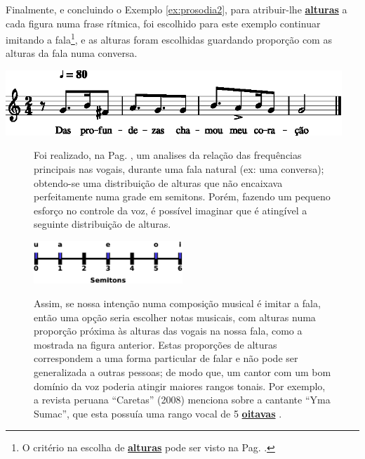 \begin{example}
\label{ex:prosodia3}
Finalmente, e concluindo o Exemplo \ref{ex:prosodia2}, 
para atribuir-lhe \hyperref[sec:pos:Altura]{\textbf{alturas}} a cada figura numa frase rítmica,
foi escolhido para este exemplo continuar imitando a fala\footnote{O 
critério na escolha de \hyperref[sec:pos:Altura]{\textbf{alturas}} pode ser visto na Pag. \pageref{ref:minhasvogais}. },
e as alturas foram escolhidas guardando proporção com as alturas da fala numa conversa.
\begin{center}
\includegraphics[width=0.95\textwidth]{chapters/cap-musica-topicos/frase5-1.eps}
\end{center}
\end{example}

\begin{figure}[!ht]
\begin{elaboracion}[title=Minhas vogais]
Foi realizado, na Pag. \pageref{fig:timbresvocais}, um analises da relação das frequências principais nas vogais,
durante uma fala natural (ex: uma conversa);
obtendo-se uma distribuição de alturas que não encaixava perfeitamente numa grade em semitons.
Porém, fazendo um pequeno esforço no controle da voz, 
é possível imaginar que é atingível a seguinte distribuição de alturas.
\begin{center}
\includegraphics[width=0.50\textwidth]{chapters/cap-musica-topicos/vocales-semitons2.eps}
\end{center}
Assim, se nossa intenção numa composição musical é imitar a fala, 
então uma opção seria escolher notas musicais, 
com alturas numa proporção próxima às alturas das vogais na nossa fala, 
como a mostrada na figura anterior.
Estas proporções de alturas correspondem a uma forma particular de falar e não pode ser generalizada a outras pessoas;
de modo que, um cantor com um bom domínio da voz poderia atingir maiores rangos tonais.
Por exemplo, a revista peruana ``Caretas'' (2008)  menciona sobre a cantante ``Yma Sumac'',
que esta possuía uma rango vocal de 5 \hyperref[sec:pos:Oitava]{\textbf{oitavas}} \cite[pp. 73]{2008caretas}.  
\end{elaboracion}
\label{ref:minhasvogais}
\end{figure}






